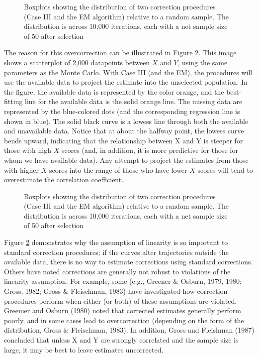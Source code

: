 \documentclass[man, babel,english]{apa}%
\begin{document}
\begin{figure}[htbp]
\begin{center}
\caption{Boxplots showing the distribution of two correction procedures (Case III and the EM algorithm) relative to a random sample. The distribution is across 10,000 iterations, each with a net sample size of 50 after selection}
\label{fig:demo}
\end{center}
\end{figure}

The reason for this overcorrection can be illustrated in Figure \ref{fig:explanation}. This image shows a scatterplot of 2,000 datapoints between $X$ and $Y$, using the same parameters as the Monte Carlo. With Case III (and the EM), the procedures will use the available data to project the estimate into the unselected population. In the figure, the available data is represented by the color orange, and the best-fitting line for the available data is the solid orange line. The missing data are represented by the blue-colored dots (and the corresponding regression line is shown in blue). The solid black curve is a lowess line through both the available and unavailable data. Notice that at about the halfway point, the lowess curve bends upward, indicating that the relationship between X and Y is steeper for those with high $X$ scores (and, in addition, it is more predictive for those for whom we have available data). Any attempt to project the estimates from those with higher $X$ scores into the range of those who have lower $X$ scores will tend to overestimate the correlation coefficient. 

\begin{figure}[htbp]
\begin{center}
\caption{Boxplots showing the distribution of two correction procedures (Case III and the EM algorithm) relative to a random sample. The distribution is across 10,000 iterations, each with a net sample size of 50 after selection}
\label{fig:explanation}
\end{center}
\end{figure}

Figure \ref{fig:explanation} demonstrates why the assumption of linearity is so important to standard correction procedures; if the curves alter trajectories outside the available data, there is no way to estimate corrections using standard corrections. Others have noted corrections are generally not robust to violations of the linearity assumption. For example, some (e.g., Greener \& Osburn, 1979, 1980; Gross, 1982; Gross \& Fleischman, 1983) have investigated how correction procedures perform when either (or both) of these assumptions are violated. Greemer and Osburn (1980) noted that corrected estimates generally perform poorly, and in some cases lead to overcorrection (depending on the form of the distribution, Gross \& Fleischman, 1983). In addition, Gross and Fleishman (1987) concluded that unless X and Y are strongly correlated and the sample size is large, it may be best to leave estimates uncorrected. 
\end{document}
